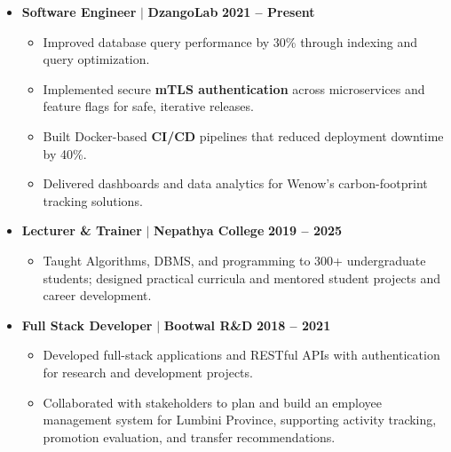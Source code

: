 \documentclass[10pt,a4paper]{article}
\begin{document}
\begin{itemize}[leftmargin=1em, label={}]
    \vspace{6pt}

    \item \textbf{Software Engineer} $|$ \textbf{DzangoLab} \hfill \textbf{2021 -- Present}
    \begin{itemize}
        \item Improved database query performance by 30\% through indexing and query optimization.
        \item Implemented secure \textbf{mTLS authentication} across microservices and feature flags for safe, iterative releases.
        \item Built Docker-based \textbf{CI/CD} pipelines that reduced deployment downtime by 40\%.
        \item Delivered dashboards and data analytics for Wenow's carbon-footprint tracking solutions.
    \end{itemize}

    \vspace{6pt}

    \item \textbf{Lecturer \& Trainer} $|$ \textbf{Nepathya College} \hfill \textbf{2019 -- 2025}
    \begin{itemize}
        \item Taught Algorithms, DBMS, and programming to 300+ undergraduate students; designed practical curricula and mentored student projects and career development.
    \end{itemize}

    \vspace{6pt}

    \item \textbf{Full Stack Developer} $|$ \textbf{Bootwal R\&D} \hfill \textbf{2018 -- 2021}
    \begin{itemize}
        \item Developed full-stack applications and RESTful APIs with authentication for research and development projects.
        \item Collaborated with stakeholders to plan and build an employee management system for Lumbini Province, supporting activity tracking, promotion evaluation, and transfer recommendations.
    \end{itemize}
\end{itemize}
\end{document}
